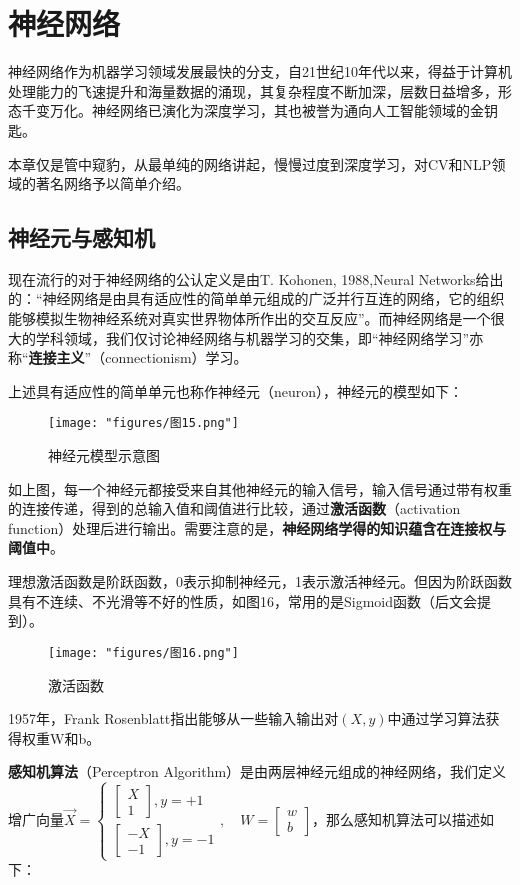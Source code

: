 \section{神经网络}
神经网络作为机器学习领域发展最快的分支，自21世纪10年代以来，得益于计算机处理能力的飞速提升和海量数据的涌现，其复杂程度不断加深，层数日益增多，形态千变万化。神经网络已演化为深度学习，其也被誉为通向人工智能领域的金钥匙。

本章仅是管中窥豹，从最单纯的网络讲起，慢慢过度到深度学习，对CV和NLP领域的著名网络予以简单介绍。
\subsection{神经元与感知机}
现在流行的对于神经网络的公认定义是由T. Kohonen, 1988,Neural Networks给出的：“神经网络是由具有适应性的简单单元组成的广泛并行互连的网络，它的组织能够模拟生物神经系统对真实世界物体所作出的交互反应”。而神经网络是一个很大的学科领域，我们仅讨论神经网络与机器学习的交集，即“神经网络学习”亦称“\textbf{连接主义}”（connectionism）学习。

上述具有适应性的简单单元也称作神经元（neuron），神经元的模型如下：
\begin{figure}[ht] %
	\centering
	\texttt{[image: "figures/图15.png"]} %
	\caption{神经元模型示意图} %
	\label{fig:example} %
\end{figure}

如上图，每一个神经元都接受来自其他神经元的输入信号，输入信号通过带有权重的连接传递，得到的总输入值和阈值进行比较，通过\textbf{激活函数}（activation function）处理后进行输出。需要注意的是，\textbf{神经网络学得的知识蕴含在连接权与阈值中}。

理想激活函数是阶跃函数，0表示抑制神经元，1表示激活神经元。但因为阶跃函数具有不连续、不光滑等不好的性质，如图16，常用的是Sigmoid函数（后文会提到）。
\begin{figure}[ht] %
	\centering
	\texttt{[image: "figures/图16.png"]} %
	\caption{激活函数} %
	\label{fig:example} %
\end{figure}


1957年，Frank Rosenblatt指出能够从一些输入输出对$(X,y)$中通过学习算法获得权重W和b。

\textbf{感知机算法}（Perceptron Algorithm）是由两层神经元组成的神经网络，我们定义增广向量$\vec{X}=\begin{cases}\begin{bmatrix}X\\1\end{bmatrix},y=+1\\\begin{bmatrix}-X\\-1\end{bmatrix},y=-1\end{cases},\quad W=\begin{bmatrix}w\\b\end{bmatrix}$，那么感知机算法可以描述如下：

